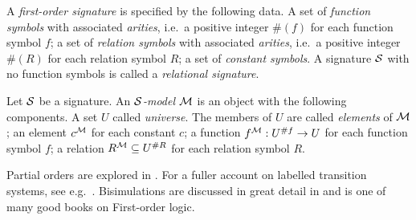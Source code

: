 \begin{definition}
A \emph{first-order signature} is specified by the following data.
 A set of \emph{function symbols} with associated \emph{arities},
i.e.~a positive integer $\#(f)$ for each function symbol $f$;  a
set of \emph{relation symbols} with associated \emph{arities}, i.e.~a
positive integer $\#(R)$ for each relation symbol $R$;  a set of
\emph{constant symbols}.  A signature $\mathcal{S}$ with no function symbols
is called a \emph{relational signature}.

Let $\mathcal{S}$ be a signature. An \emph{$\mathcal{S}$-model} $\mathcal{M}$ is an
object with the following components.  A set $U$ called
\emph{universe}.  The members of $U$ are called \emph{elements} of
$\mathcal{M}$; an element $c^{\mathcal{M}}$ for each constant $c$; a function
$f^{\mathcal{M}} : U^{\#f} \rightarrow U$ for each function symbol $f$; a
relation $R^{\mathcal{M}} \subseteq U^{\#R}$ for each relation symbol $R$.


\end{definition}

\NI Partial orders are explored in \cite{DaveyBA:intlatao}. For a
fuller account on labelled transition systems, see
e.g.~\cite{SassoneV:modcontac,HennessyM:Algtheop}. Bisimulations are
discussed in great detail in \cite{SangiorgiD:intbisac} and
\cite{EndertonHB:matinttl} is one of many good books on First-order
logic.

